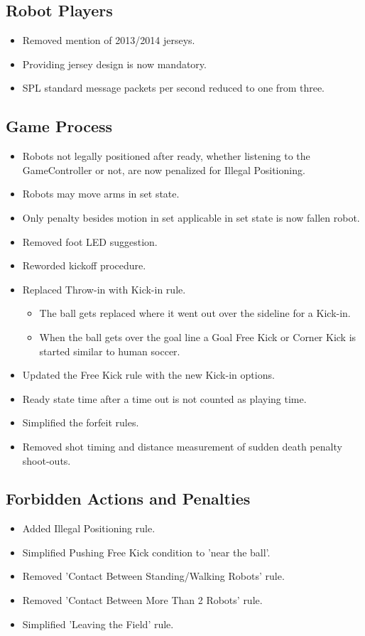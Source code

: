 \documentclass[12pt]{article}
\begin{document}
\subsection*{Robot Players}
\begin{itemize}
  \item Removed mention of 2013/2014 jerseys.
  \item Providing jersey design is now mandatory.
  \item SPL standard message packets per second reduced to one from three.
\end{itemize}

\subsection*{Game Process}
\begin{itemize}
  \item Robots not legally positioned after ready, whether listening to the GameController or not, are now penalized for Illegal Positioning.
  \item Robots may move arms in set state.
  \item Only penalty besides motion in set applicable in set state is now fallen robot.
  \item Removed foot LED suggestion.
  \item Reworded kickoff procedure.
  \item Replaced Throw-in with Kick-in rule.
  \begin{itemize}
    \item The ball gets replaced where it went out over the sideline for a Kick-in.
    \item When the ball gets over the goal line a Goal Free Kick or Corner Kick is started similar to human soccer.
  \end{itemize}
  \item Updated the Free Kick rule with the new Kick-in options.
  \item Ready state time after a time out is not counted as playing time.
  \item Simplified the forfeit rules.
  \item Removed shot timing and distance measurement of sudden death penalty shoot-outs.
\end{itemize}

\subsection*{Forbidden Actions and Penalties}
\begin{itemize}
  \item Added Illegal Positioning rule.
  \item Simplified Pushing Free Kick condition to 'near the ball'.
  \item Removed 'Contact Between Standing/Walking Robots' rule.
  \item Removed 'Contact Between More Than 2 Robots' rule.
  \item Simplified 'Leaving the Field' rule.
\end{itemize}
\end{document}
